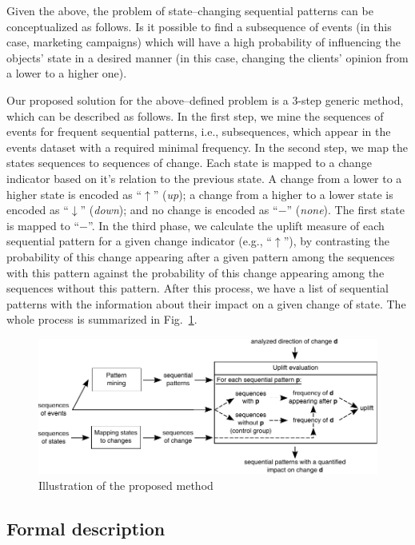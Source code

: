 \documentclass[runningheads,a4paper]{llncs}
\begin{document}
Given the above, the problem of state--changing sequential patterns can be conceptualized as follows.
Is it possible to find a subsequence of events (in this case, marketing campaigns) which will have a high probability of influencing the objects' state in a desired manner (in this case, changing the clients' opinion from a lower to a higher one).

Our proposed solution for the above--defined problem is a 3-step generic method, which can be described as follows.
In the first step, we mine the sequences of events for frequent sequential patterns, i.e., subsequences, which appear in the events dataset with a required minimal frequency.
In the second step, we map the states sequences to sequences of change.
Each state is mapped to a change indicator based on it's relation to the previous state.
A change from a lower to a higher state is encoded as ``$\uparrow$'' (\textit{up}); a change from a higher to a lower state is encoded as ``$\downarrow$'' (\textit{down}); and no change is encoded as ``$-$'' (\textit{none}).
The first state is mapped to ``$-$''.
In the third phase, we calculate the uplift measure of each sequential pattern for a given change indicator (e.g., ``$\uparrow$''), by contrasting the probability of this change appearing after a given pattern among the sequences with this pattern against the probability of this change appearing among the sequences without this pattern.
After this process, we have a list of sequential patterns with the information about their impact on a given change of state.
The whole process is summarized in Fig.~\ref{fig:concept}.

\begin{figure}[!ht]
	\centering
		\includegraphics[width=\textwidth]{images/concept}
	\caption{Illustration of the proposed method}
	\label{fig:concept}
\end{figure}

\subsection{Formal description}
\end{document}
